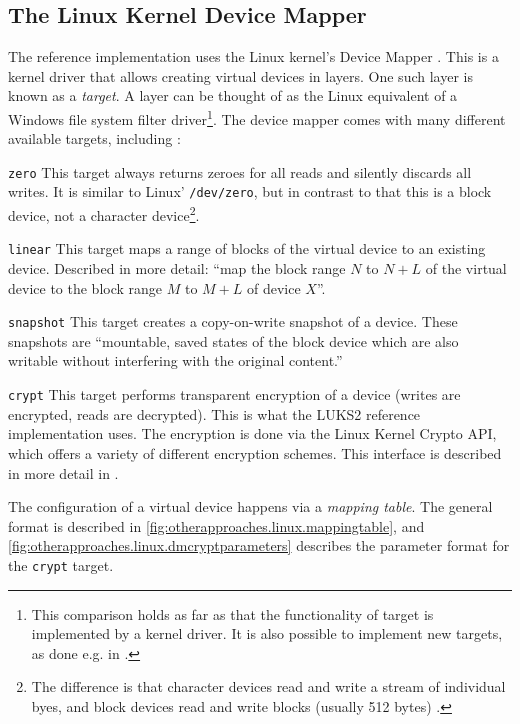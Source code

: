\subsection{The Linux Kernel Device Mapper}
\label{chap:otherapproaches.linux.dm}
The reference implementation uses the Linux kernel's Device Mapper \cite{Dmcrypt2020}. This is a kernel driver that allows creating virtual devices in layers. One such layer is known as a \emph{target}. A layer can be thought of as the Linux equivalent of a Windows file system filter driver\footnote{\label{fn:otherapproaches.linux.dmtargetdriver} This comparison holds as far as that the functionality of target is implemented by a kernel driver. It is also possible to implement new targets, as done e.g. in \cite{Barker2019}.}. The device mapper comes with many different available targets, including \cite{Linux}:
\begin{descitemize}
	\item[\texttt{zero}] This target always returns zeroes for all reads and silently discards all writes. It is similar to Linux' \texttt{/dev/zero}, but in contrast to that this is a block device, not a character device\footnote{\label{fn:otherapproaches.linux.charvsblock} The difference is that character devices read and write a stream of individual byes, and block devices read and write blocks (usually 512 bytes) \cite{Corbet2005}.}.
	\item[\texttt{linear}] This target maps a range of blocks of the virtual device to an existing device. Described in more detail: ``map the block range $N$ to $N+L$ of the virtual device to the block range $M$ to $M+L$ of device $X$''.
	\item[\texttt{snapshot}] This target creates a copy-on-write snapshot of a device. These snapshots are ``mountable, saved states of the block device which are also writable without interfering with the original content.'' \cite{Linux}
	\item[\texttt{crypt}] This target performs transparent encryption of a device (writes are encrypted, reads are decrypted). This is what the LUKS2 reference implementation uses. The encryption is done via the Linux Kernel Crypto API, which offers a variety of different encryption schemes. This interface is described in more detail in \cite{Linux}.
\end{descitemize}

The configuration of a virtual device happens via a \emph{mapping table}. The general format is described in \autoref{fig:otherapproaches.linux.mappingtable}, and \autoref{fig:otherapproaches.linux.dmcryptparameters} describes the parameter format for the \texttt{crypt} target.

